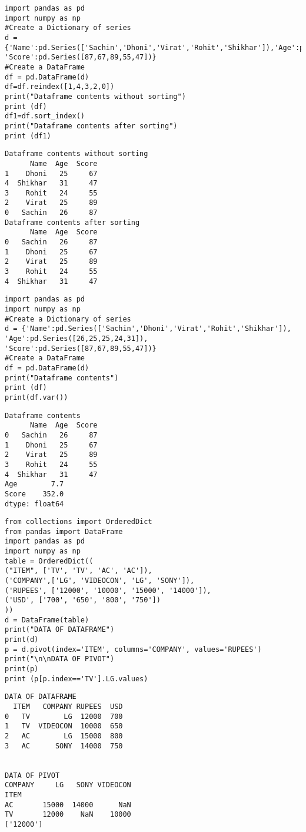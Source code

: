 \documentclass[11pt]{article}
\begin{document}
\begin{verbatim}
import pandas as pd
import numpy as np
#Create a Dictionary of series
d = {'Name':pd.Series(['Sachin','Dhoni','Virat','Rohit','Shikhar']),'Age':pd.Series([26,25,25,24,31]), 'Score':pd.Series([87,67,89,55,47])}
#Create a DataFrame
df = pd.DataFrame(d)
df=df.reindex([1,4,3,2,0])
print("Dataframe contents without sorting")
print (df)
df1=df.sort_index()
print("Dataframe contents after sorting")
print (df1)
\end{verbatim}

\begin{verbatim}
Dataframe contents without sorting
      Name  Age  Score
1    Dhoni   25     67
4  Shikhar   31     47
3    Rohit   24     55
2    Virat   25     89
0   Sachin   26     87
Dataframe contents after sorting
      Name  Age  Score
0   Sachin   26     87
1    Dhoni   25     67
2    Virat   25     89
3    Rohit   24     55
4  Shikhar   31     47
\end{verbatim}

\begin{verbatim}
import pandas as pd
import numpy as np
#Create a Dictionary of series
d = {'Name':pd.Series(['Sachin','Dhoni','Virat','Rohit','Shikhar']),
'Age':pd.Series([26,25,25,24,31]),
'Score':pd.Series([87,67,89,55,47])}
#Create a DataFrame
df = pd.DataFrame(d)
print("Dataframe contents")
print (df)
print(df.var())
\end{verbatim}

\begin{verbatim}
Dataframe contents
      Name  Age  Score
0   Sachin   26     87
1    Dhoni   25     67
2    Virat   25     89
3    Rohit   24     55
4  Shikhar   31     47
Age        7.7
Score    352.0
dtype: float64
\end{verbatim}

\begin{verbatim}
from collections import OrderedDict
from pandas import DataFrame
import pandas as pd
import numpy as np
table = OrderedDict((
("ITEM", ['TV', 'TV', 'AC', 'AC']),
('COMPANY',['LG', 'VIDEOCON', 'LG', 'SONY']),
('RUPEES', ['12000', '10000', '15000', '14000']),
('USD', ['700', '650', '800', '750'])
))
d = DataFrame(table)
print("DATA OF DATAFRAME")
print(d)
p = d.pivot(index='ITEM', columns='COMPANY', values='RUPEES')
print("\n\nDATA OF PIVOT")
print(p)
print (p[p.index=='TV'].LG.values)
\end{verbatim}

\begin{verbatim}
DATA OF DATAFRAME
  ITEM   COMPANY RUPEES  USD
0   TV        LG  12000  700
1   TV  VIDEOCON  10000  650
2   AC        LG  15000  800
3   AC      SONY  14000  750


DATA OF PIVOT
COMPANY     LG   SONY VIDEOCON
ITEM
AC       15000  14000      NaN
TV       12000    NaN    10000
['12000']
\end{verbatim}
\end{document}
